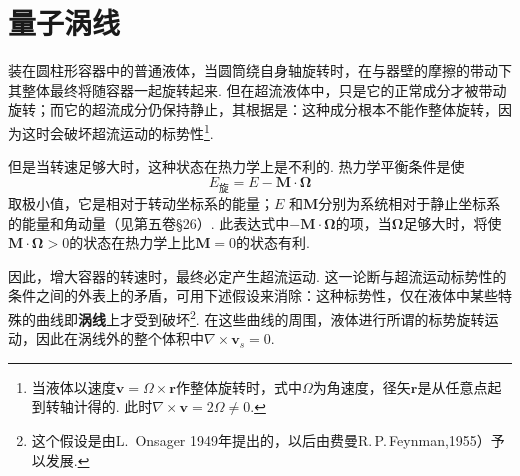 
\section{量子涡线}

装在圆柱形容器中的普通液体，当圆筒绕自身轴旋转时，在与器壁的摩擦的带动下其整体最终将随容器一起旋转起来. 但在超流液体中，只是它的正常成分才被带动旋转；而它的超流成分仍保持静止，其根据是：这种成分根本不能作整体旋转，因为这时会破坏超流运动的标势性\footnote{当液体以速度$\bm{v}=\bm{\varOmega}\times\bm{r}$作整体旋转时，式中$\bm{\varOmega}$为角速度，径矢$\bm{r}$是从任意点起到转轴计得的. 此时$\nabla\times\bm{v}=2\bm{\varOmega}\neq0$.}.

但是当转速足够大时，这种状态在热力学上是不利的. 热力学平衡条件是使
\begin{equation}
E_{\text{旋}}=E-\bm{M}\cdot\bm{\Omega}
\label{29.1}
\end{equation}
取极小值，它是相对于转动坐标系的能量；$E$ 和$\bm{M}$分别为系统相对于静止坐标系的能量和角动量（见第五卷§26）. 此表达式中$-\bm{M}\cdot\bm{\Omega}$的项，当$\bm{\Omega}$足够大时，将使$\bm{M}\cdot\bm{\Omega}>0$的状态在热力学上比$\bm{M}=0$的状态有利.

因此，增大容器的转速时，最终必定产生超流运动. 这一论断与超流运动标势性的条件之间的外表上的矛盾，可用下述假设来消除：这种标势性，仅在液体中某些特殊的曲线即\textbf{涡线}上才受到破坏\footnote{这个假设是由L.~Onsager 1949年提出的，以后由费曼R.\,P.\,Feynman,1955）予以发展.}. 在这些曲线的周围，液体进行所谓的标势旋转运动，因此在涡线外的整个体积中$\nabla\times\bm{v}_{s}=0$.

